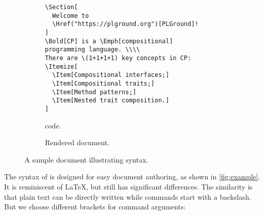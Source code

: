 \begin{figure}
\begin{subfigure}{0.58\textwidth}
\begin{Verbatim}[fontsize=\small]
\Section[
  Welcome to
  \Href("https://plground.org")[PLGround]!
]
\Bold[CP] is a \Emph[compositional]
programming language. \\\\
There are \(1+1+1+1) key concepts in CP:
\Itemize[
  \Item[Compositional interfaces;]
  \Item[Compositional traits;]
  \Item[Method patterns;]
  \Item[Nested trait composition.]
]
\end{Verbatim}
\caption{\ExT code.}
\end{subfigure}%
\begin{subfigure}{0.42\textwidth}
\vspace{2em}
\caption{Rendered document.}
\end{subfigure}
\caption{A sample document illustrating \ExT syntax.} \label{fig:example}
\end{figure}

\noindent
The syntax of \ExT is designed for easy document authoring, as shown in
\autoref{fig:example}. It is reminiscent of \LaTeX, but still has significant
differences. The similarity is that plain text can be directly written while
commands start with a backslash. But we choose different brackets for command
arguments:


